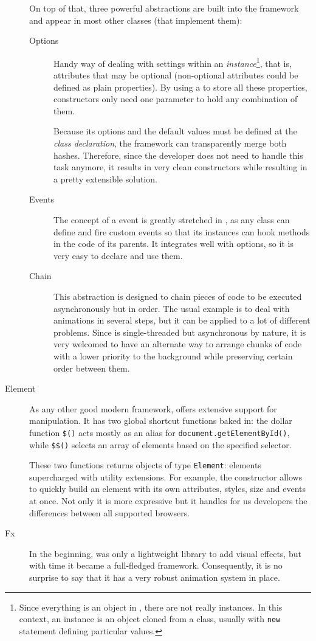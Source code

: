 \begin{description}
  On top of that, three powerful abstractions are built into the framework and appear in most other classes (that implement them):
  \begin{description}
    \item[Options] Handy way of dealing with settings within an \emph{instance}\footnote{Since everything is an object in , there are not really instances. In this context, an instance is an object cloned from a  class, usually with \texttt{new} statement defining particular values.}, that is, attributes that may be optional (non-optional attributes could be defined as plain properties).
    By using a  to store all these properties, constructors only need one parameter to hold any combination of them.
    
    Because its options and the default values must be defined at the \emph{class declaration}, the framework can transparently merge both hashes.
    Therefore, since the developer does not need to handle this task anymore, it results in very clean constructors while resulting in a pretty extensible solution.
    \item[Events] The concept of a event is greatly stretched in , as any class can define and fire custom events so that its instances can hook methods in the code of its parents.
    It integrates well with  options, so it is very easy to declare and use them.
    \item[Chain] This abstraction is designed to chain pieces of code to be executed asynchronously but in order.
    The usual example is to deal with animations in several steps, but it can be applied to a lot of different problems.
    Since  is single-threaded but asynchronous by nature, it is very welcomed to have an alternate way to arrange chunks of code with a lower priority to the background while preserving certain order between them.
  \end{description}
  \item[Element] As any other good modern framework,  offers extensive support for  manipulation.
  It has two global shortcut functions baked in: the dollar function \texttt{\$()} acts mostly as an alias for \texttt{document.getElementById()}, while \texttt{\$\$()} selects an array of  elements based on the specified  selector.
  
  These two functions returns objects of type \texttt{Element}:  elements supercharged with utility extensions.
  For example, the constructor allows to quickly build an element with its own attributes, styles, size and events at once.
  Not only it is more expressive but it handles for us developers the differences between all supported browsers.
  \item[Fx] In the beginning,  was only a lightweight library to add visual effects, but with time it became a full-fledged framework.
  Consequently, it is no surprise to say that it has a very robust animation system in place.
  

\end{description}
